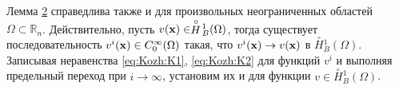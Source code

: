 \smallskip



\begin{remark}[1]

 Лемма \hyperlink{kozh:lemma2}{2} справедлива также и для произвольных не\-ог\-раниченных областей $\Omega\subset\mathbb{R}_n$. Действительно, пусть $v({\bf x})\in\stackrel {\circ}{H}\!_{B}^1(\Omega)$, тогда существует последовательность $v^i({\bf x})\in C_0^\infty(\Omega)$ такая, что $v^i({\bf x}) \to  v({\bf x})$ в $\stackrel {\circ}{H}\!_{B}^1(\Omega)$. Записывая неравенства \eqref{eq:Kozh:K1}, \eqref{eq:Kozh:K2} для функций $v^i$ и выполняя предельный переход при $i \to \infty$, установим их и для функции $v\in\stackrel {\circ}{H}\!_{B}^1(\Omega)$.

\end{remark}



\smallskip



